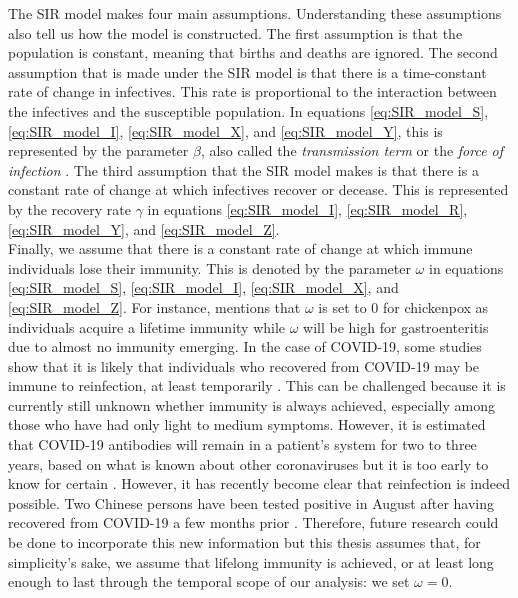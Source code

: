 \documentclass[12pt]{article}
\begin{document}
	The SIR model makes four main assumptions. Understanding these assumptions also tell us how the model is constructed. The first assumption is that the population is constant, meaning that births and deaths are ignored. The second assumption that is made under the SIR model is that there is a time-constant rate of change in infectives. This rate is proportional to the interaction between the infectives and the susceptible population. In equations \eqref{eq:SIR_model_S}, \eqref{eq:SIR_model_I}, \eqref{eq:SIR_model_X}, and \eqref{eq:SIR_model_Y}, this is represented by the parameter $\beta$, also called the \textit{transmission term} or the \textit{force of infection} \parencite{keeling2011modeling}.
	The third assumption that the SIR model makes is that there is a constant rate of change at which infectives recover or decease. This is represented by the recovery rate $\gamma$ in equations \eqref{eq:SIR_model_I}, \eqref{eq:SIR_model_R}, \eqref{eq:SIR_model_Y}, and \eqref{eq:SIR_model_Z}.  \\
	
	Finally, we assume that there is a constant rate of change at which immune individuals lose their immunity. This is denoted by the parameter $\omega$ in equations \eqref{eq:SIR_model_S}, \eqref{eq:SIR_model_I}, \eqref{eq:SIR_model_X}, and \eqref{eq:SIR_model_Z}.  For instance, \textcite{adda2016economic} mentions that $\omega$ is set to 0 for chickenpox as individuals acquire a lifetime immunity while $\omega$ will be high for gastroenteritis due to almost no immunity emerging. In the case of COVID-19, some studies show that it is likely that individuals who recovered from COVID-19 may be immune to reinfection, at least temporarily \parencite{kirkcaldy2020covid}. This can be challenged because it is currently still unknown whether immunity is always achieved, especially among those who have had only light to medium symptoms. However, it is estimated that COVID-19 antibodies will remain in a patient’s system for two to three years, based on what is known about other coronaviruses but it is too early to know for certain \parencite{leung_2020}. However, it has recently become clear that reinfection is indeed possible. Two Chinese persons have been tested positive in August after having recovered from COVID-19 a few months prior \parencite{bloomberg2020reinfection}. Therefore, future research could be done to incorporate this new information but this thesis assumes that, for simplicity's sake, we assume that lifelong immunity is achieved, or at least long enough to last through the temporal scope of our analysis: we set $\omega = 0$. \\
	
\end{document}
